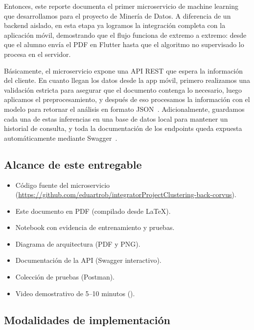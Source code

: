 

Entonces, este reporte documenta el primer microservicio de machine learning que desarrollamos para el proyecto de Minería de Datos. A diferencia de un backend aislado, en esta etapa ya logramos la integración completa con la aplicación móvil, demostrando que el flujo funciona de extremo a extremo: desde que el alumno envía el PDF en Flutter hasta que el algoritmo no supervisado lo procesa en el servidor.

Básicamente, el microservicio expone una API REST que espera la información del cliente. En cuanto llegan los datos desde la app móvil, primero realizamos una validación estricta para asegurar que el documento contenga lo necesario, luego aplicamos el preprocesamiento, y después de eso procesamos la información con el modelo para retornar el análisis en formato JSON~\cite{han2011data,scikit-learn}. Adicionalmente, guardamos cada una de estas inferencias en una base de datos local para mantener un historial de consulta, y toda la documentación de los endpoints queda expuesta automáticamente mediante Swagger~\cite{openapi}.

\subsection{Alcance de este entregable}

\begin{itemize}
  \item Código fuente del microservicio (\url{https://github.com/eduartrob/integratorProjectClustering-back-corvus}).
  \item Este documento en PDF (compilado desde \LaTeX{}).
  \item Notebook con evidencia de entrenamiento y pruebas.
  \item Diagrama de arquitectura (PDF y PNG).
  \item Documentación de la API (Swagger interactivo).
  \item Colección de pruebas (Postman).
  \item Video demostrativo de 5--10 minutos (\ReporteVideo).
\end{itemize}

\subsection{Modalidades de implementación}

